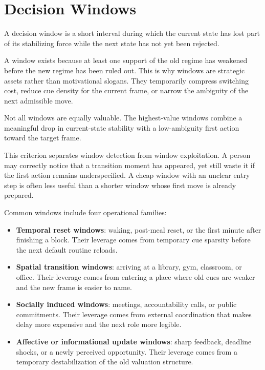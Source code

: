 \section{Decision Windows}

\begin{definition}
A decision window is a short interval during which the current state has lost
part of its stabilizing force while the next state has not yet been rejected.
\end{definition}

\begin{discussion}
A window exists because at least one support of the old regime has weakened
before the new regime has been ruled out. This is why windows are strategic
assets rather than motivational slogans. They temporarily compress switching
cost, reduce cue density for the current frame, or narrow the ambiguity of the
next admissible move.
\end{discussion}

\begin{proposition}
Not all windows are equally valuable. The highest-value windows combine a
meaningful drop in current-state stability with a low-ambiguity first action
toward the target frame.
\end{proposition}

\begin{discussion}
This criterion separates window detection from window exploitation. A person
may correctly notice that a transition moment has appeared, yet still waste it
if the first action remains underspecified. A cheap window with an unclear
entry step is often less useful than a shorter window whose first move is
already prepared.
\end{discussion}

Common windows include four operational families:
\begin{itemize}[nosep]
  \item \textbf{Temporal reset windows}: waking, post-meal reset, or the first
        minute after finishing a block. Their leverage comes from temporary cue
        sparsity before the next default routine reloads.
  \item \textbf{Spatial transition windows}: arriving at a library, gym,
        classroom, or office. Their leverage comes from entering a place where
        old cues are weaker and the new frame is easier to name.
  \item \textbf{Socially induced windows}: meetings, accountability calls, or
        public commitments. Their leverage comes from external coordination
        that makes delay more expensive and the next role more legible.
  \item \textbf{Affective or informational update windows}: sharp feedback,
        deadline shocks, or a newly perceived opportunity. Their leverage
        comes from a temporary destabilization of the old valuation structure.
\end{itemize}

